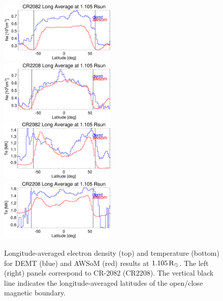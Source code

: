 \documentclass[namedreferences]{solarphysics}
\newcommand{\mrsun}{{\rm R_\odot}}
\begin{document}
\begin{article}
\begin{figure}[h!]
\begin{center}
\includegraphics[width=0.495\textwidth]{figs/Perfil_Ne_demt_awsom_2082_1105.eps}
\includegraphics[width=0.495\textwidth]{figs/Perfil_Ne_demt_awsom_2208_1105.eps}
\includegraphics[width=0.495\textwidth]{figs/Perfil_Te_demt_awsom_2082_1105.eps}
\includegraphics[width=0.495\textwidth]{figs/Perfil_Te_demt_awsom_2208_1105.eps}
\caption{Longitude-averaged electron density (top) and temperature (bottom) for DEMT (blue) and AWSoM (red) results at $1.105\,\mrsun$. The left (right) panels correspond to CR-2082 (CR2208). The vertical black line indicates the longitude-averaged latitudes of the open/close magnetic boundary.}
\label{perf_lon_ne}
\end{center}
\end{figure}




\end{article}
\end{document}
